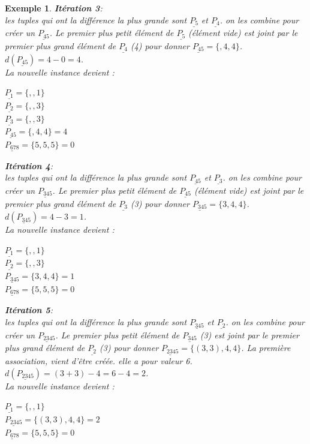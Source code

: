 \documentclass[a4paper,12pt]{report}
\theoremstyle{plain}				%
\newtheorem{example}{Exemple}
\theoremstyle{definition}				%
\begin{document}
\begin{itemize}
\begin{example}
\textbf{Itération 3}:\\
les tuples qui ont la différence la plus grande sont
$\underline{P_{5}}$  et $\underline{P_{4}}$.
on les combine pour créer un $\underline{P_{45}}$. Le premier plus petit élément de $\underline{P_{5}}$ (élément vide) est joint par le premier plus grand élément de $\underline{P_{4}}$ (4) pour donner  $\underline{P_{45}} = \{,4,4\}$. $d(\underline{P_{45}}) = 4-0 = 4$.\\
La nouvelle instance devient :\\
\begin{multicols}{3}
$\underline{P_{1}} = \{,,1\}$\\
$\underline{P_{2}} = \{,,3\}$\\
$\underline{P_{3}} = \{,,3\}$\\
$\underline{P_{45}} = \{,4,4\}=4$\\
$\underline{P_{678}} = \{5,5,5\}=0$\\
\end{multicols}

\textbf{Itération 4}:\\
les tuples qui ont la différence la plus grande sont
$\underline{P_{45}}$  et $\underline{P_{3}}$.
on les combine pour créer un $\underline{P_{345}}$. Le premier plus petit élément de $\underline{P_{45}}$ (élément vide) est joint par le premier plus grand élément de $\underline{P_{3}}$ (3) pour donner  $\underline{P_{345}} = \{3,4,4\}$. $d(\underline{P_{345}}) = 4-3 = 1$.\\
La nouvelle instance devient :\\
\begin{multicols}{3}
$\underline{P_{1}} = \{,,1\}$\\
$\underline{P_{2}} = \{,,3\}$\\
$\underline{P_{345}} = \{3,4,4\}=1$\\
$\underline{P_{678}} = \{5,5,5\}=0$\\
\end{multicols}

\textbf{Itération 5}:\\
les tuples qui ont la différence la plus grande sont
$\underline{P_{345}}$  et $\underline{P_{2}}$.
on les combine pour créer un $\underline{P_{2345}}$. Le premier plus petit élément de $\underline{P_{345}}$ (3) est joint par le premier plus grand élément de $\underline{P_{2}}$ (3) pour donner  $\underline{P_{2345}} = \{(3,3),4,4\}$. La première association, vient d'être créée. elle a pour valeur 6.
$d(\underline{P_{2345}}) = (3+3)-4 = 6-4=2$.\\
La nouvelle instance devient :\\
\begin{multicols}{2}
$\underline{P_{1}} = \{,,1\}$\\
$\underline{P_{2345}} = \{(3,3),4,4\}=2$\\
$\underline{P_{678}} = \{5,5,5\}=0$\\
\end{multicols}


\end{example}
\end{itemize}
\end{document}
